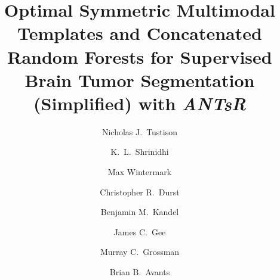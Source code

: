 \documentclass[preprint,authoryear,review,12pt]{elsarticle}
\begin{document}
\begin{frontmatter}

\title{Optimal Symmetric Multimodal Templates and Concatenated Random Forests for Supervised Brain Tumor Segmentation (Simplified) with \textit{ANTsR}}

\author[label1]{Nicholas J.~Tustison
  }
\author[label2]{K.~L.~Shrinidhi}
\author[label1]{Max Wintermark}
\author[label1]{Christopher R.~Durst}
\author[label2]{Benjamin M.~Kandel}
\author[label2]{James C.~Gee}
\author[label3]{Murray C.~Grossman}
\author[label2]{Brian B.~Avants}
\address[label1]{Department of Radiology and Medical Imaging, University of Virginia, Charlottesville, VA}
\address[label2]{Penn Image Computing and Science Laboratory, 
                 Department of Radiology, University of Pennsylvania,
                Philadelphia, PA}
\address[label3]{Department of Neurology, University of Pennsylvania,
                Philadelphia, PA}




\end{frontmatter}
\end{document}

